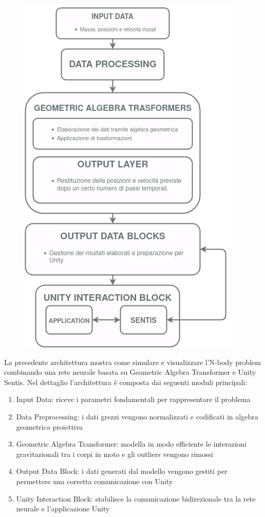 \begin{frame}
    \begin{figure}[!hb]
        \includegraphics[scale = .375]{../Images/Architecture.png}
    \end{figure}
\end{frame}

\begin{frame}
    La precedente architettura mostra come simulare e visualizzare l'N-body problem combinando una rete neurale basata su Geometric Algebra Transformer e Unity Sentis.
    Nel dettaglio l'architettura è composta dai seguenti moduli principali:
    \begin{enumerate}
        \item Input Data: riceve i parametri fondamentali per rappresentare il problema
        \item Data Preprocessing: i dati grezzi vengono normalizzati e codificati in algebra geometrica proiettiva 
        \item Geometric Algebra Transformer: modella in modo efficiente le interazioni gravitazionali tra i corpi in moto e gli outliers vengono rimossi
        \item Output Data Block: i dati generati dal modello vengono gestiti per permettere una corretta comunicazione con Unity
        \item Unity Interaction Block: stabilisce la comunicazione bidirezionale tra la rete neurale e l'applicazione Unity
    \end{enumerate}
\end{frame}

